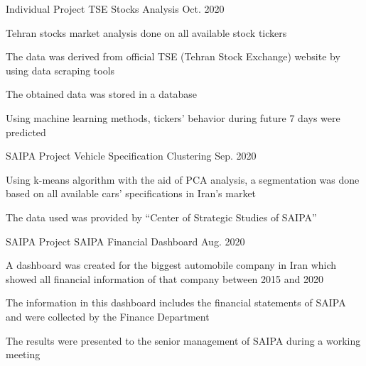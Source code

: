 \begin{cventries}
  \cventry
    {Individual Project} %
    {TSE Stocks Analysis} %
    { } %
    {Oct. 2020} %
    {
      \begin{cvitems} %
        \item {Tehran stocks market analysis done on all available stock tickers}
        \item {The data was derived from official TSE (Tehran Stock Exchange) website by using data scraping tools}
        \item {The obtained data was stored in a database}
        \item {Using machine learning methods, tickers' behavior during future 7 days were predicted}
      \end{cvitems}
    }

  \cventry
    {SAIPA Project} %
    {Vehicle Specification Clustering} %
    { } %
    {Sep. 2020} %
    {
      \begin{cvitems} %
        \item {Using k-means algorithm with the aid of PCA analysis, a segmentation was done based on all available cars' specifications in Iran's market}
        \item {The data used was provided by ``Center of Strategic Studies of SAIPA''}
      \end{cvitems}
    }

  \cventry
    {SAIPA Project} %
    {SAIPA Financial Dashboard} %
    { } %
    {Aug. 2020} %
    {
      \begin{cvitems} %
        \item {A dashboard was created for the biggest automobile company in Iran which showed all financial information of that company between 2015 and 2020}
        \item {The information in this dashboard includes the financial statements of SAIPA and were collected by the Finance Department}
        \item{The results were presented to the senior management of SAIPA during a working meeting}
      \end{cvitems}
    }

\end{cventries}


